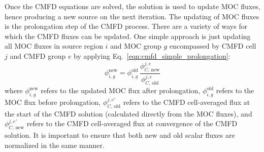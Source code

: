 Once the \ac{CMFD} equations are solved, the solution is used to update \ac{MOC} fluxes, hence producing a new source on the next iteration. The updating of \ac{MOC} fluxes is the prolongation step of the \ac{CMFD} process. There are a variety of ways for which the \ac{CMFD} fluxes can be updated. One simple approach is just updating all \ac{MOC} fluxes in source region $i$ and \ac{MOC} group $g$ encompassed by \ac{CMFD} cell $j$ and \ac{CMFD} group $e$ by applying Eq.~\ref{eqn:cmfd_simple_prolongation}:
\begin{equation}
\phi_{i,g}^{\text{new}} = \phi_{i,g}^{\text{old}} \, \frac{\phi_{C, \, \text{new}}^{j,e}}{\phi_{C, \, \text{old}}^{j,e}}
\label{eqn:cmfd_simple_prolongation}
\end{equation}
where $\phi_{i,g}^{\text{new}}$ refers to the updated \ac{MOC} flux after prolongation, $\phi_{i,g}^{\text{old}}$ refers to the \ac{MOC} flux before prolongation, $\phi_{C, \, \text{old}}^{j,e'}$ refers to the \ac{CMFD} cell-averaged flux at the start of the \ac{CMFD} solution (calculated directly from the \ac{MOC} fluxes), and $\phi_{C, \, \text{new}}^{j,e'}$ refers to the \ac{CMFD} cell-averaged flux at convergence of the \ac{CMFD} solution. It is important to ensure that both new and old scalar fluxes are normalized in the same manner.

